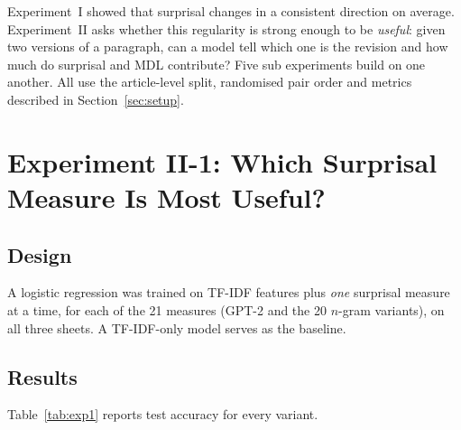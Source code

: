 \documentclass[12pt,a4paper,oneside]{report}
\begin{document}
Experiment~I showed that surprisal changes in a consistent direction on average. Experiment~II asks whether this regularity is strong enough to be \emph{useful}: given two versions of a paragraph, can a model tell which one is the revision and how much do surprisal and MDL contribute? Five sub experiments build on one another. All use the article-level split, randomised pair order and metrics described in Section~\ref{sec:setup}.

\section{Experiment II-1: Which Surprisal Measure Is Most Useful?}
\label{sec:exp1}
\subsection{Design}
A logistic regression was trained on TF-IDF features plus \emph{one} surprisal measure at a time, for each of the 21 measures (GPT-2 and the 20 $n$-gram variants), on all three sheets. A TF-IDF-only model serves as the baseline.

\subsection{Results}
Table~\ref{tab:exp1} reports test accuracy for every variant.
\end{document}
